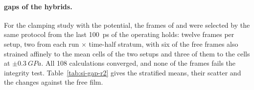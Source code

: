 \paragraph{\rSCAN{} gaps of the hybrids.} For the clamping study with the \rSCAN{} potential, the frames of \MASnI{}
and \FASnI{} were selected by the same protocol from the last \SI{100}{ps} of the operating holds: twelve frames per
setup, two from each run $\times$ time-half stratum, with six of the free frames also strained affinely to the mean
cells of the two setups and three of them to the cells at $\pm\SI{0.3}{GPa}$. All 108 calculations converged, and none
of the frames fails the integrity test. Table~\ref{tab:si-gap-r2} gives the stratified means, their scatter and the
changes against the free film.


